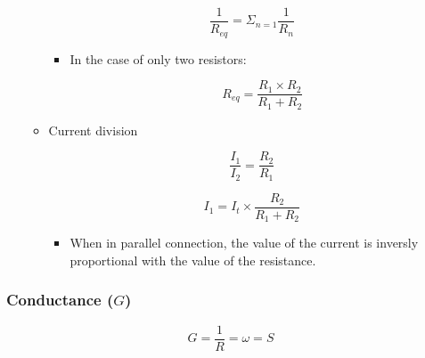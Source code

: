 \documentclass[11pt]{article}
\begin{document}
\begin{enumerate}
\begin{itemize}
$$\frac{1}{R_{eq}} = \Sigma_{n = 1} \frac{1}{R_n}$$

\begin{itemize}
\item In the case of only two resistors:

$$R_{eq} = \frac{R_1 \times R_2}{R_1 + R_2}$$
\end{itemize}

\item Current division

$$\frac{I_1}{I_2} = \frac{R_2}{R_1}$$

$$I_1 = I_t \times \frac{R_2}{R_1 + R_2}$$

\begin{itemize}
\item When in parallel connection, the value of the current is inversly proportional with the value of the resistance.
\end{itemize}
\end{itemize}
\end{enumerate}
\subsubsection{Conductance (\(G\))}
\label{sec:org3b24d52}

$$G = \frac{1}{R} = \omega = S$$
\end{document}
